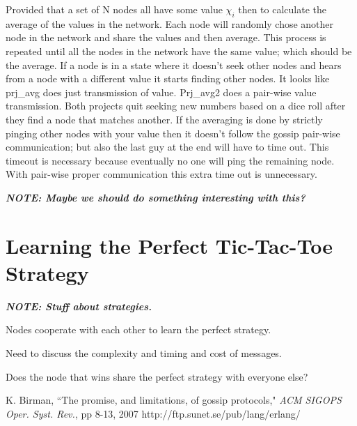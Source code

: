 \documentclass[11pt,twocolumn]{article}
\begin{document}
Provided that a set of N nodes all have some value $\chi_i$ then to calculate the average of the values in the network.  Each node will randomly chose another node in the network and share the values and then average.  This process is repeated until all the nodes in the network have the same value; which should be the average.  If a node is in a state where it doesn't seek other nodes and hears from a node with a different value it starts finding other nodes.  It looks like prj\_avg does just transmission of value.  Prj\_avg2 does a pair-wise value transmission.  Both projects quit seeking new numbers based on a dice roll after they find a node that matches another.  If the averaging is done by strictly pinging other nodes with your value then it doesn't follow the gossip pair-wise communication; but also the last guy at the end will have to time out.  This timeout is necessary because eventually no one will ping the remaining node.  With pair-wise proper communication this extra time out is unnecessary.

{\bf {\em NOTE: Maybe we should do something interesting with this?}}

\section{Learning the Perfect Tic-Tac-Toe Strategy}

{\bf {\em NOTE: Stuff about strategies.}}

Nodes cooperate with each other to learn the perfect strategy.

Need to discuss the complexity and timing and cost of messages.

Does the node that wins share the perfect strategy with everyone else?

\begin{thebibliography}{10}
K. Birman, ``The promise, and limitations, of gossip protocols," \emph{ACM SIGOPS Oper. Syst. Rev.}, pp 8-13, 2007
http://ftp.sunet.se/pub/lang/erlang/
\end{thebibliography}

\end{document}
